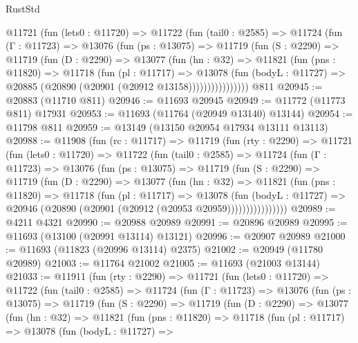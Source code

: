 \begin{lexlean}{RustStd}
\begin{coremodule}
        @11721
          (fun (lets0 : @11720) =>
          @11722
            (fun (tail0 : @2585) =>
            @11724
              (fun (Γ : @11723) =>
              @13076
                (fun (ps : @13075) =>
                @11719
                  (fun (S : @2290) =>
                  @11719
                    (fun (D : @2290) =>
                    @13077
                      (fun (hn : @32) =>
                      @11821
                        (fun (pns : @11820) =>
                        @11718
                          (fun (pl : @11717) =>
                          @13078
                            (fun (bodyL : @11727) =>
                            @20885 (@20890 (@20901 (@20912 @13158))))))))))))))))
    @811
@20945 := @20883 (@11710 @811)
@20946 := @11693 @20945
@20949 := @11772 (@11773 @811) @17931
@20953 := @11693 (@11764 (@20949 @13140) @13144)
@20954 := @11798 @811
@20959 := @13149 (@13150 @20954 @17934 @13111 @13113)
@20988 := @11908
    (fun (rc : @11717) =>
    @11719
      (fun (rty : @2290) =>
      @11721
        (fun (lets0 : @11720) =>
        @11722
          (fun (tail0 : @2585) =>
          @11724
            (fun (Γ : @11723) =>
            @13076
              (fun (ps : @13075) =>
              @11719
                (fun (S : @2290) =>
                @11719
                  (fun (D : @2290) =>
                  @13077
                    (fun (hn : @32) =>
                    @11821
                      (fun (pns : @11820) =>
                      @11718
                        (fun (pl : @11717) =>
                        @13078
                          (fun (bodyL : @11727) =>
                          @20946 (@20890 (@20901 (@20912 (@20953 @20959))))))))))))))))
@20989 := @4211 @4321
@20990 := @20988 @20989
@20991 := @20896 @20989
@20995 := @11693 (@13100 (@20991 @13114) @13121)
@20996 := @20907 @20989
@21000 := @11693 (@11823 (@20996 @13114) @2375)
@21002 := @20949 (@11780 @20989)
@21003 := @11764 @21002
@21005 := @11693 (@21003 @13144)
@21033 := @11911
    (fun (rty : @2290) =>
    @11721
      (fun (lets0 : @11720) =>
      @11722
        (fun (tail0 : @2585) =>
        @11724
          (fun (Γ : @11723) =>
          @13076
            (fun (ps : @13075) =>
            @11719
              (fun (S : @2290) =>
              @11719
                (fun (D : @2290) =>
                @13077
                  (fun (hn : @32) =>
                  @11821
                    (fun (pns : @11820) =>
                    @11718
                      (fun (pl : @11717) =>
                      @13078
                        (fun (bodyL : @11727) =>

\end{coremodule}
\end{lexlean}
